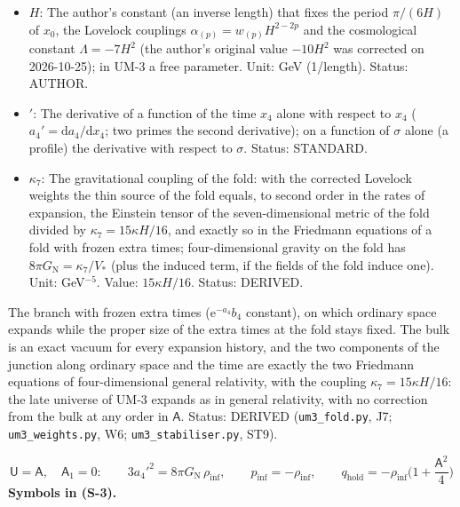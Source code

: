 \documentclass[
  10pt,
]{article}
\begin{document}
\begin{itemize}
  Status: STANDARD.
\item
  \(H\): The author's constant (an inverse length) that fixes the period
  \(\pi/(6H)\) of \(x_0\), the Lovelock couplings
  \(\alpha_{(p)} = w_{(p)}H^{2-2p}\) and the cosmological constant
  \(\Lambda = -7H^2\) (the author's original value \(-10H^2\) was
  corrected on 2026-10-25); in UM-3 a free parameter. Unit: GeV
  (1/length). Status: AUTHOR.
\item
  \({}'\): The derivative of a function of the time \(x_4\) alone with
  respect to \(x_4\) (\(a_4' = \mathrm{d}a_4/\mathrm{d}x_4\); two primes
  the second derivative); on a function of \(\sigma\) alone (a profile)
  the derivative with respect to \(\sigma\). Status: STANDARD.
\item
  \(\kappa_7\): The gravitational coupling of the fold: with the
  corrected Lovelock weights the thin source of the fold equals, to
  second order in the rates of expansion, the Einstein tensor of the
  seven-dimensional metric of the fold divided by
  \(\kappa_7 = 15\kappa H/16\), and exactly so in the Friedmann
  equations of a fold with frozen extra times; four-dimensional gravity
  on the fold has \(8\pi G_{\mathrm{N}} = \kappa_7/V_*\) (plus the
  induced term, if the fields of the fold induce one). Unit:
  GeV\(^{-5}\). Value: \(15\kappa H/16\). Status: DERIVED.
\end{itemize}

The branch with frozen extra times (\(\mathrm{e}^{-a_4}b_4\) constant),
on which ordinary space expands while the proper size of the extra times
at the fold stays fixed. The bulk is an exact vacuum for every expansion
history, and the two components of the junction along ordinary space and
the time are exactly the two Friedmann equations of four-dimensional
general relativity, with the coupling \(\kappa_7 = 15\kappa H/16\): the
late universe of UM-3 expands as in general relativity, with no
correction from the bulk at any order in \(\mathsf{A}\). Status: DERIVED
(\texttt{um3\_fold.py}, J7; \texttt{um3\_weights.py}, W6;
\texttt{um3\_stabiliser.py}, ST9).

\[
\mathsf{U} = \mathsf{A},\quad \mathsf{A}_1 = 0:\qquad 3a_4'^2 = 8\pi G_{\mathrm{N}}\,\rho_{\mathrm{inf}},\qquad
p_{\mathrm{inf}} = -\rho_{\mathrm{inf}},\qquad q_{\mathrm{hold}} = -\rho_{\mathrm{inf}}\Big(1 + \frac{\mathsf{A}^2}{4}\Big) \tag{S-3}
\] \textbf{Symbols in (S-3).}
\end{document}
